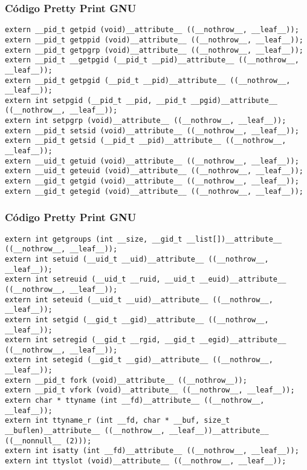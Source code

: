 \documentclass{beamer}
\begin{document}
\begin{frame}[fragile]
\frametitle{C\'odigo Pretty Print GNU}
\begin{verbatim}
extern __pid_t getpid (void)__attribute__ ((__nothrow__, __leaf__));
extern __pid_t getppid (void)__attribute__ ((__nothrow__, __leaf__));
extern __pid_t getpgrp (void)__attribute__ ((__nothrow__, __leaf__));
extern __pid_t __getpgid (__pid_t __pid)__attribute__ ((__nothrow__, __leaf__));
extern __pid_t getpgid (__pid_t __pid)__attribute__ ((__nothrow__, __leaf__));
extern int setpgid (__pid_t __pid, __pid_t __pgid)__attribute__ ((__nothrow__, __leaf__));
extern int setpgrp (void)__attribute__ ((__nothrow__, __leaf__));
extern __pid_t setsid (void)__attribute__ ((__nothrow__, __leaf__));
extern __pid_t getsid (__pid_t __pid)__attribute__ ((__nothrow__, __leaf__));
extern __uid_t getuid (void)__attribute__ ((__nothrow__, __leaf__));
extern __uid_t geteuid (void)__attribute__ ((__nothrow__, __leaf__));
extern __gid_t getgid (void)__attribute__ ((__nothrow__, __leaf__));
extern __gid_t getegid (void)__attribute__ ((__nothrow__, __leaf__));
\end{verbatim}
\end{frame}
\begin{frame}[fragile]
\frametitle{C\'odigo Pretty Print GNU}
\begin{verbatim}
extern int getgroups (int __size, __gid_t __list[])__attribute__ ((__nothrow__, __leaf__));
extern int setuid (__uid_t __uid)__attribute__ ((__nothrow__, __leaf__));
extern int setreuid (__uid_t __ruid, __uid_t __euid)__attribute__ ((__nothrow__, __leaf__));
extern int seteuid (__uid_t __uid)__attribute__ ((__nothrow__, __leaf__));
extern int setgid (__gid_t __gid)__attribute__ ((__nothrow__, __leaf__));
extern int setregid (__gid_t __rgid, __gid_t __egid)__attribute__ ((__nothrow__, __leaf__));
extern int setegid (__gid_t __gid)__attribute__ ((__nothrow__, __leaf__));
extern __pid_t fork (void)__attribute__ ((__nothrow__));
extern __pid_t vfork (void)__attribute__ ((__nothrow__, __leaf__));
extern char * ttyname (int __fd)__attribute__ ((__nothrow__, __leaf__));
extern int ttyname_r (int __fd, char * __buf, size_t __buflen)__attribute__ ((__nothrow__, __leaf__))__attribute__ ((__nonnull__ (2)));
extern int isatty (int __fd)__attribute__ ((__nothrow__, __leaf__));
extern int ttyslot (void)__attribute__ ((__nothrow__, __leaf__));
\end{verbatim}
\end{frame}
\end{document}
